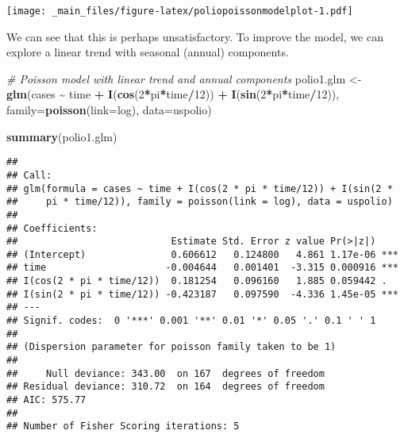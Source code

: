 \documentclass[
  12pt,
]{book}
\newenvironment{Shaded}{\begin{snugshade}}{\end{snugshade}}
\newcommand{\AttributeTok}[1]{\textcolor[rgb]{0.13,0.29,0.53}{#1}}
\newcommand{\CommentTok}[1]{\textcolor[rgb]{0.56,0.35,0.01}{\textit{#1}}}
\newcommand{\DecValTok}[1]{\textcolor[rgb]{0.00,0.00,0.81}{#1}}
\newcommand{\FunctionTok}[1]{\textcolor[rgb]{0.13,0.29,0.53}{\textbf{#1}}}
\newcommand{\NormalTok}[1]{#1}
\newcommand{\OtherTok}[1]{\textcolor[rgb]{0.56,0.35,0.01}{#1}}
\newcommand{\SpecialCharTok}[1]{\textcolor[rgb]{0.81,0.36,0.00}{\textbf{#1}}}
\newcommand{\StringTok}[1]{\textcolor[rgb]{0.31,0.60,0.02}{#1}}
\begin{document}
\texttt{[image: \_main\_files/figure-latex/poliopoissonmodelplot-1.pdf]}

We can see that this is perhaps unsatisfactory. To improve the model, we can explore a linear trend with seasonal (annual) components.

\begin{Shaded}
\begin{Highlighting}[]
\CommentTok{\# Poisson model with linear trend and annual components}
\NormalTok{polio1.glm }\OtherTok{\textless{}{-}} \FunctionTok{glm}\NormalTok{(cases }\SpecialCharTok{\textasciitilde{}}\NormalTok{ time }\SpecialCharTok{+} \FunctionTok{I}\NormalTok{(}\FunctionTok{cos}\NormalTok{(}\DecValTok{2}\SpecialCharTok{*}\NormalTok{pi}\SpecialCharTok{*}\NormalTok{time}\SpecialCharTok{/}\DecValTok{12}\NormalTok{)) }\SpecialCharTok{+} \FunctionTok{I}\NormalTok{(}\FunctionTok{sin}\NormalTok{(}\DecValTok{2}\SpecialCharTok{*}\NormalTok{pi}\SpecialCharTok{*}\NormalTok{time}\SpecialCharTok{/}\DecValTok{12}\NormalTok{)),}
\AttributeTok{family=}\FunctionTok{poisson}\NormalTok{(}\AttributeTok{link=}\NormalTok{log), }\AttributeTok{data=}\NormalTok{uspolio)}

\FunctionTok{summary}\NormalTok{(polio1.glm)}
\end{Highlighting}
\end{Shaded}

\begin{verbatim}
## 
## Call:
## glm(formula = cases ~ time + I(cos(2 * pi * time/12)) + I(sin(2 * 
##     pi * time/12)), family = poisson(link = log), data = uspolio)
## 
## Coefficients:
##                           Estimate Std. Error z value Pr(>|z|)    
## (Intercept)               0.606612   0.124800   4.861 1.17e-06 ***
## time                     -0.004644   0.001401  -3.315 0.000916 ***
## I(cos(2 * pi * time/12))  0.181254   0.096160   1.885 0.059442 .  
## I(sin(2 * pi * time/12)) -0.423187   0.097590  -4.336 1.45e-05 ***
## ---
## Signif. codes:  0 '***' 0.001 '**' 0.01 '*' 0.05 '.' 0.1 ' ' 1
## 
## (Dispersion parameter for poisson family taken to be 1)
## 
##     Null deviance: 343.00  on 167  degrees of freedom
## Residual deviance: 310.72  on 164  degrees of freedom
## AIC: 575.77
## 
## Number of Fisher Scoring iterations: 5
\end{verbatim}

\begin{Shaded}
\end{Shaded}
\end{document}
